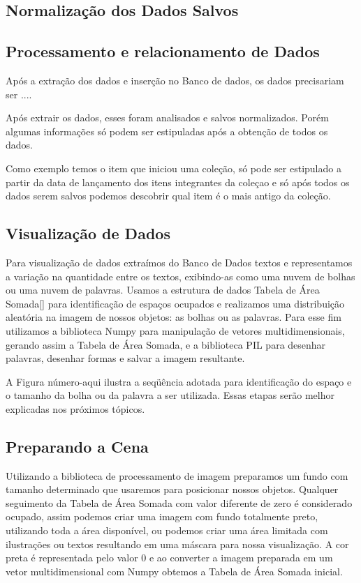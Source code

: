 \documentclass[12pt]{article}
\begin{document}
\begin{comments}

\subsection{Normalização dos Dados Salvos}\subsection{Processamento e relacionamento de Dados}

Após a extração dos dados e inserção no Banco de dados, os dados precisariam ser ....


Após extrair os dados, esses foram analisados e salvos normalizados. Porém algumas informações só podem ser estipuladas após a obtenção de todos os dados.

Como exemplo temos o item que iniciou uma coleção, só pode ser estipulado a partir da data de lançamento dos itens integrantes da coleçao e só após todos os dados serem salvos podemos descobrir qual item é o mais antigo da coleção.
\end{comments}


\subsection{Visualização de Dados}

Para visualização de dados extraímos do Banco de Dados textos e representamos a variação na quantidade entre os textos, exibindo-as como uma nuvem de bolhas ou uma nuvem de palavras. 
Usamos a estrutura de dados Tabela de Área Somada[] para identificação de espaços ocupados e realizamos uma distribuição aleatória na imagem de nossos objetos: as bolhas ou as palavras.
Para esse fim utilizamos a biblioteca Numpy para manipulação de vetores multidimensionais, gerando assim a Tabela de Área Somada, e a biblioteca PIL para desenhar palavras, desenhar formas e salvar a imagem resultante.

A Figura número-aqui ilustra a seqüência adotada para identificação do espaço e o tamanho da bolha ou da palavra a ser utilizada. Essas etapas serão melhor explicadas nos próximos tópicos.   

\subsection{Preparando a Cena}

Utilizando a biblioteca de processamento de imagem preparamos um fundo com tamanho determinado que usaremos para posicionar nossos objetos. 
Qualquer seguimento da Tabela de Área Somada com valor diferente de zero é considerado ocupado, assim podemos criar uma imagem com fundo totalmente preto, utilizando toda a área disponível, ou podemos criar uma área limitada com ilustrações ou textos resultando em uma máscara para nossa visualização.
A cor preta é representada pelo valor 0 e ao converter a imagem preparada em um vetor multidimensional com Numpy obtemos a Tabela de Área Somada inicial.
\end{document}
